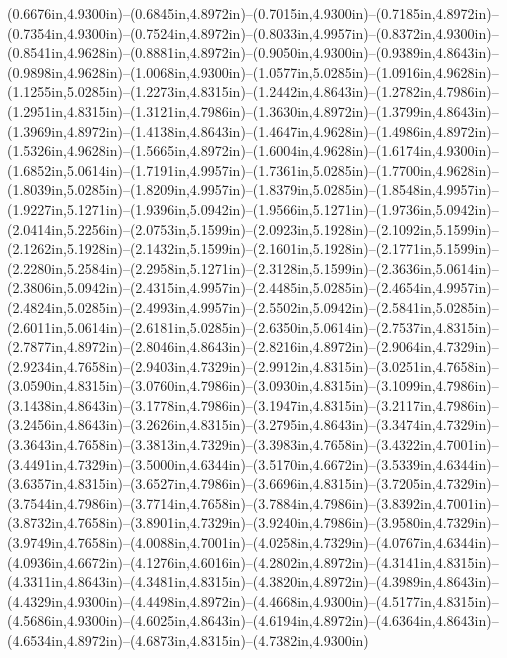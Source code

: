 (0.6676in,4.9300in)--(0.6845in,4.8972in)--(0.7015in,4.9300in)--(0.7185in,4.8972in)--(0.7354in,4.9300in)--(0.7524in,4.8972in)--(0.8033in,4.9957in)--(0.8372in,4.9300in)--(0.8541in,4.9628in)--(0.8881in,4.8972in)--(0.9050in,4.9300in)--(0.9389in,4.8643in)--(0.9898in,4.9628in)--(1.0068in,4.9300in)--(1.0577in,5.0285in)--(1.0916in,4.9628in)--(1.1255in,5.0285in)--(1.2273in,4.8315in)--(1.2442in,4.8643in)--(1.2782in,4.7986in)--(1.2951in,4.8315in)--(1.3121in,4.7986in)--(1.3630in,4.8972in)--(1.3799in,4.8643in)--(1.3969in,4.8972in)--(1.4138in,4.8643in)--(1.4647in,4.9628in)--(1.4986in,4.8972in)--(1.5326in,4.9628in)--(1.5665in,4.8972in)--(1.6004in,4.9628in)--(1.6174in,4.9300in)--(1.6852in,5.0614in)--(1.7191in,4.9957in)--(1.7361in,5.0285in)--(1.7700in,4.9628in)--(1.8039in,5.0285in)--(1.8209in,4.9957in)--(1.8379in,5.0285in)--(1.8548in,4.9957in)--(1.9227in,5.1271in)--(1.9396in,5.0942in)--(1.9566in,5.1271in)--(1.9736in,5.0942in)--(2.0414in,5.2256in)--(2.0753in,5.1599in)--(2.0923in,5.1928in)--(2.1092in,5.1599in)--(2.1262in,5.1928in)--(2.1432in,5.1599in)--(2.1601in,5.1928in)--(2.1771in,5.1599in)--(2.2280in,5.2584in)--(2.2958in,5.1271in)--(2.3128in,5.1599in)--(2.3636in,5.0614in)--(2.3806in,5.0942in)--(2.4315in,4.9957in)--(2.4485in,5.0285in)--(2.4654in,4.9957in)--(2.4824in,5.0285in)--(2.4993in,4.9957in)--(2.5502in,5.0942in)--(2.5841in,5.0285in)--(2.6011in,5.0614in)--(2.6181in,5.0285in)--(2.6350in,5.0614in)--(2.7537in,4.8315in)--(2.7877in,4.8972in)--(2.8046in,4.8643in)--(2.8216in,4.8972in)--(2.9064in,4.7329in)--(2.9234in,4.7658in)--(2.9403in,4.7329in)--(2.9912in,4.8315in)--(3.0251in,4.7658in)--(3.0590in,4.8315in)--(3.0760in,4.7986in)--(3.0930in,4.8315in)--(3.1099in,4.7986in)--(3.1438in,4.8643in)--(3.1778in,4.7986in)--(3.1947in,4.8315in)--(3.2117in,4.7986in)--(3.2456in,4.8643in)--(3.2626in,4.8315in)--(3.2795in,4.8643in)--(3.3474in,4.7329in)--(3.3643in,4.7658in)--(3.3813in,4.7329in)--(3.3983in,4.7658in)--(3.4322in,4.7001in)--(3.4491in,4.7329in)--(3.5000in,4.6344in)--(3.5170in,4.6672in)--(3.5339in,4.6344in)--(3.6357in,4.8315in)--(3.6527in,4.7986in)--(3.6696in,4.8315in)--(3.7205in,4.7329in)--(3.7544in,4.7986in)--(3.7714in,4.7658in)--(3.7884in,4.7986in)--(3.8392in,4.7001in)--(3.8732in,4.7658in)--(3.8901in,4.7329in)--(3.9240in,4.7986in)--(3.9580in,4.7329in)--(3.9749in,4.7658in)--(4.0088in,4.7001in)--(4.0258in,4.7329in)--(4.0767in,4.6344in)--(4.0936in,4.6672in)--(4.1276in,4.6016in)--(4.2802in,4.8972in)--(4.3141in,4.8315in)--(4.3311in,4.8643in)--(4.3481in,4.8315in)--(4.3820in,4.8972in)--(4.3989in,4.8643in)--(4.4329in,4.9300in)--(4.4498in,4.8972in)--(4.4668in,4.9300in)--(4.5177in,4.8315in)--(4.5686in,4.9300in)--(4.6025in,4.8643in)--(4.6194in,4.8972in)--(4.6364in,4.8643in)--(4.6534in,4.8972in)--(4.6873in,4.8315in)--(4.7382in,4.9300in) 